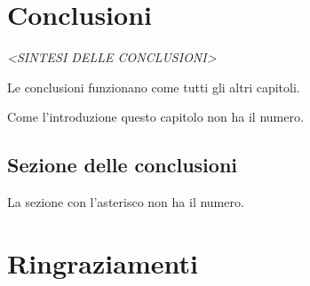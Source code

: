 \documentclass[envcountsame,envcountchap]{svmono}
\begin{document}
    


\chapter*{Conclusioni}

\vspace{2cm}

\begin{flushright}
 \textit{<SINTESI DELLE CONCLUSIONI>}
\end{flushright}

\vspace{0.5cm}

Le conclusioni funzionano come tutti gli altri capitoli.

Come l'introduzione questo capitolo non ha il numero.

\section*{Sezione delle conclusioni}
La sezione con l'asterisco non ha il numero.

\chapter*{Ringraziamenti}







\end{document}
